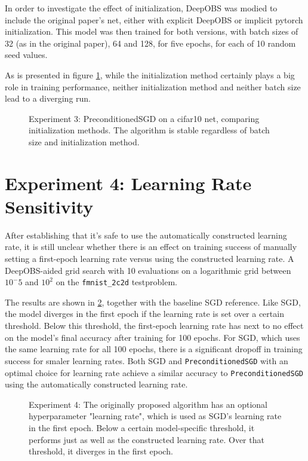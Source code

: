 \documentclass[twoside,12pt,a4paper]{report}
\begin{document}
In order to investigate the effect of initialization, DeepOBS was modied to include the original paper's net, either with explicit DeepOBS or implicit pytorch initialization. This model was then trained for both versions, with batch sizes of 32 (as in the original paper), 64 and 128, for five epochs, for each of 10 random seed values.

As is presented in figure \ref{fig:exp_init}, while the initialization method certainly plays a big role in training performance, neither initialization method and neither batch size lead to a diverging run.
\begin{figure}
	\centering \hspace{-1,5cm}
	
	\caption{Experiment 3: PreconditionedSGD on a cifar10 net, comparing initialization methods. The algorithm is stable regardless of batch size and initialization method.}
	\label{fig:exp_init}
	
\end{figure}


\section{Experiment 4: Learning Rate Sensitivity}

After establishing that it's safe to use the automatically constructed learning rate, it is still unclear whether there is an effect on training success of manually setting a first-epoch learning rate versus using the constructed learning rate.
A DeepOBS-aided grid search with 10 evaluations on a logarithmic grid between $10^-5$ and $10^2$ on the \verb|fmnist_2c2d| testproblem.

The results are shown in \ref{fig:exp_lr_sens}, together with the baseline SGD reference.
Like SGD, the model diverges in the first epoch if the learning rate is set over a certain threshold. Below this threshold, the first-epoch learning rate has next to no effect on the model's final accuracy after training for 100 epochs. For SGD, which uses the same learning rate for all 100 epochs, there is a significant dropoff in training success for smaler learning rates.
Both SGD and \verb|PreconditionedSGD| with an optimal choice for learning rate achieve a similar accuracy to \verb|PreconditionedSGD| using the automatically constructed learning rate. 

\begin{figure}
	\centering \hspace{-1,5cm}
	
	\caption{Experiment 4: The originally proposed algorithm has an optional hyperparameter "learning rate", which is used as SGD's learning rate in the first epoch. Below a certain model-specific threshold, it performs just as well as the constructed learning rate. Over that threshold, it diverges in the first epoch. }
	\label{fig:exp_lr_sens}
\end{figure}
\end{document}
